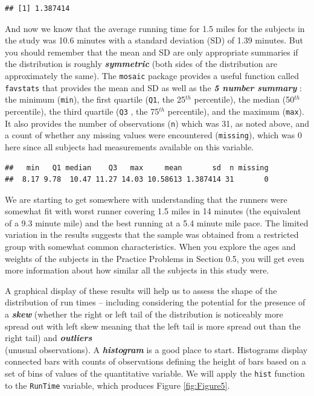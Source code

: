 \documentclass[]{book}
\newenvironment{Shaded}{\begin{snugshade}}{\end{snugshade}}
\newcommand{\KeywordTok}[1]{\textcolor[rgb]{0.13,0.29,0.53}{\textbf{{#1}}}}
\newcommand{\NormalTok}[1]{{#1}}
\begin{document}
\begin{verbatim}
## [1] 1.387414
\end{verbatim}

And now we know that the average running time for 1.5 miles for the
subjects in the study was 10.6 minutes with a standard deviation (SD) of
1.39 minutes. But you should remember that the mean and SD are only
appropriate summaries if the distribution is roughly
\textbf{\emph{symmetric}} (both sides of the distribution are
approximately the same). The \texttt{mosaic} package provides a useful
function called \texttt{favstats} that provides the mean and SD as well
as the \textbf{\emph{5 number summary}} : the minimum (\texttt{min}),
the first quartile (\texttt{Q1}, the 25\(^{th}\) percentile), the median
(50\(^{th}\) percentile), the third quartile (\texttt{Q3} , the
75\(^{th}\) percentile), and the maximum (\texttt{max}). It also
provides the number of observations (\texttt{n}) which was 31, as noted
above, and a count of whether any missing values were encountered
(\texttt{missing}), which was 0 here since all subjects had measurements
available on this variable.

\begin{Shaded}
\end{Shaded}

\begin{verbatim}
##   min   Q1 median    Q3   max     mean       sd  n missing
##  8.17 9.78  10.47 11.27 14.03 10.58613 1.387414 31       0
\end{verbatim}

We are starting to get somewhere with understanding that the runners
were somewhat fit with worst runner covering 1.5 miles in 14 minutes
(the equivalent of a 9.3 minute mile) and the best running at a 5.4
minute mile pace. The limited variation in the results suggests that the
sample was obtained from a restricted group with somewhat common
characteristics. When you explore the ages and weights of the subjects
in the Practice Problems in Section 0.5, you will get even more
information about how similar all the subjects in this study were.

A graphical display of these results will help us to assess the shape of
the distribution of run times -- including considering the potential for
the presence of a \textbf{\emph{skew}} (whether the right or left tail
of the distribution is noticeably more spread out with left skew meaning
that the left tail is more spread out than the right tail) and
\textbf{\emph{outliers}}\\
(unusual observations). A \textbf{\emph{histogram }} is a good place to
start. Histograms display connected bars with counts of observations
defining the height of bars based on a set of bins of values of the
quantitative variable. We will apply the \texttt{hist} function to the
\texttt{RunTime} variable, which produces Figure \ref{fig:Figure5}.
\end{document}
